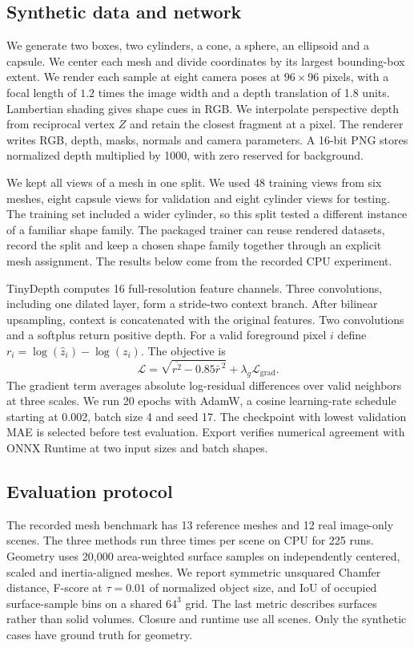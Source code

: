 \documentclass[conference]{IEEEtran}
\begin{document}
\subsection{Synthetic data and network}
We generate two boxes, two cylinders, a cone, a sphere, an ellipsoid and a capsule. We center each mesh and divide coordinates by its largest bounding-box extent. We render each sample at eight camera poses at $96\!\times\!96$ pixels, with a focal length of $1.2$ times the image width and a depth translation of 1.8 units. Lambertian shading gives shape cues in RGB. We interpolate perspective depth from reciprocal vertex $Z$ and retain the closest fragment at a pixel. The renderer writes RGB, depth, masks, normals and camera parameters. A 16-bit PNG stores normalized depth multiplied by 1000, with zero reserved for background.

We kept all views of a mesh in one split. We used 48 training views from six meshes, eight capsule views for validation and eight cylinder views for testing. The training set included a wider cylinder, so this split tested a different instance of a familiar shape family. The packaged trainer can reuse rendered datasets, record the split and keep a chosen shape family together through an explicit mesh assignment. The results below come from the recorded CPU experiment.

TinyDepth computes 16 full-resolution feature channels. Three convolutions, including one dilated layer, form a stride-two context branch. After bilinear upsampling, context is concatenated with the original features. Two convolutions and a softplus return positive depth. For a valid foreground pixel $i$ define $r_i=\log(\hat z_i)-\log(z_i)$. The objective is
\begin{equation}
\mathcal L=\sqrt{\overline{r^2}-0.85\bar r^{\,2}}
              +\lambda_g\mathcal L_\mathrm{grad}.
\end{equation}
The gradient term averages absolute log-residual differences over valid neighbors at three scales. We run 20 epochs with AdamW, a cosine learning-rate schedule starting at 0.002, batch size 4 and seed 17. The checkpoint with lowest validation MAE is selected before test evaluation. Export verifies numerical agreement with ONNX Runtime at two input sizes and batch shapes.

\subsection{Evaluation protocol}
The recorded mesh benchmark has 13 reference meshes and 12 real image-only scenes. The three methods run three times per scene on CPU for 225 runs. Geometry uses 20,000 area-weighted surface samples on independently centered, scaled and inertia-aligned meshes. We report symmetric unsquared Chamfer distance, F-score at $\tau=0.01$ of normalized object size, and IoU of occupied surface-sample bins on a shared $64^3$ grid. The last metric describes surfaces rather than solid volumes. Closure and runtime use all scenes. Only the synthetic cases have ground truth for geometry.
\end{document}
